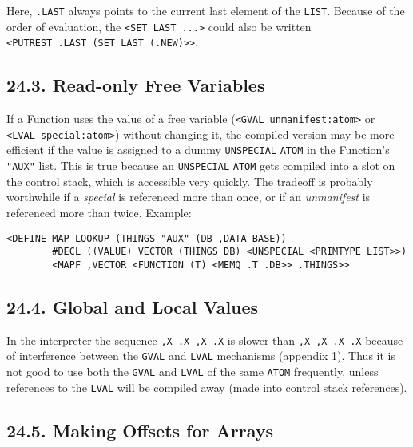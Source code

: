 \documentclass[a4paper,]{article}
\begin{document}
Here, \texttt{.LAST} always points to the current last element of the \texttt{LIST}. Because of the order of evaluation,
the \texttt{\textless{}SET\ LAST\ ...\textgreater{}} could also be written
\texttt{\textless{}PUTREST\ .LAST\ (SET\ LAST\ (.NEW)\textgreater{}\textgreater{}}.

\subsection{24.3. Read-only Free Variables}\label{read-only-free-variables}

If a Function uses the value of a free variable (\texttt{\textless{}GVAL\ unmanifest:atom\textgreater{}} or
\texttt{\textless{}LVAL\ special:atom\textgreater{}}) without changing it, the compiled version may be more efficient if
the value is assigned to a dummy \texttt{UNSPECIAL} \texttt{ATOM} in the Function's \texttt{"AUX"} list. This is true
because an \texttt{UNSPECIAL} \texttt{ATOM} gets compiled into a slot on the control stack, which is accessible very
quickly. The tradeoff is probably worthwhile if a \emph{special} is referenced more than once, or if an \emph{unmanifest}
is referenced more than twice. Example:

\begin{verbatim}
<DEFINE MAP-LOOKUP (THINGS "AUX" (DB ,DATA-BASE))
        #DECL ((VALUE) VECTOR (THINGS DB) <UNSPECIAL <PRIMTYPE LIST>>)
        <MAPF ,VECTOR <FUNCTION (T) <MEMQ .T .DB>> .THINGS>>
\end{verbatim}

\subsection{24.4. Global and Local Values}\label{global-and-local-values}

In the interpreter the sequence \texttt{,X\ .X\ ,X\ .X} is slower than \texttt{,X\ ,X\ .X\ .X} because of interference
between the \texttt{GVAL} and \texttt{LVAL} mechanisms (appendix 1). Thus it is
not good to use both the \texttt{GVAL} and \texttt{LVAL} of the same \texttt{ATOM} frequently, unless references to the
\texttt{LVAL} will be compiled away (made into control stack references).

\subsection{24.5. Making Offsets for Arrays}\label{making-offsets-for-arrays}
\end{document}
